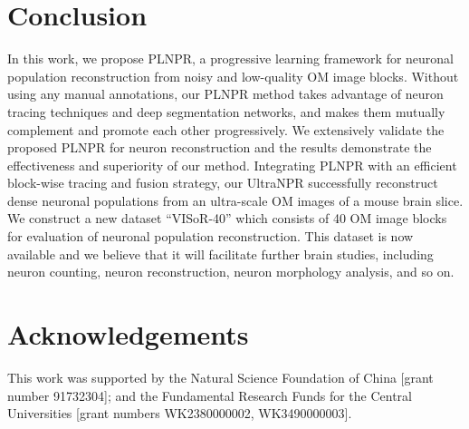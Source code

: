 \documentclass[times,twocolumn,final]{elsarticle}
\begin{document}





\section{Conclusion}
\label{sec:conclusion}
In this work, we propose PLNPR, a progressive learning framework for neuronal population reconstruction from noisy and low-quality OM image blocks.
Without using any manual annotations, our PLNPR method takes advantage of neuron tracing techniques and deep segmentation networks, and makes them mutually complement and promote each other progressively.
We extensively validate the proposed PLNPR for neuron reconstruction and the results demonstrate the effectiveness and superiority of our method.
Integrating PLNPR with an efficient block-wise tracing and fusion strategy, our UltraNPR successfully reconstruct dense neuronal populations from an ultra-scale OM images of a mouse brain slice.
%
We construct a new dataset ``VISoR-40'' which consists of 40 OM image blocks for evaluation of neuronal population reconstruction.
This dataset is now available and we believe that it will facilitate further brain studies, including neuron counting, neuron reconstruction, neuron morphology analysis, and so on.

\section*{Acknowledgements}
This work was supported by the Natural Science Foundation of China [grant number 91732304]; and the Fundamental Research Funds for the Central Universities [grant numbers WK2380000002, WK3490000003].
 


\end{document}
